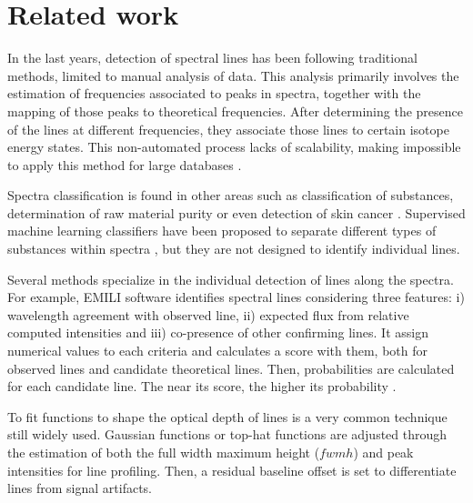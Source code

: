 \section{Related work} \label{sec:related_work}

\begin{comment}
    - What is currently being done
    - Manual Process Problems
    - Factors that make this problem non-trivial
    - Semi-Automatic Method
    - Ramadan Spectroscopy
    - Physics Models
    - Utility of another approach (this approach)
\end{comment}

In the last years, detection of spectral lines has been following traditional methods, limited to manual analysis of data.
This analysis primarily involves the estimation of frequencies associated to peaks in spectra, together with the mapping of those peaks
to theoretical frequencies.
After determining the presence of the lines at different frequencies, they associate those lines to certain isotope energy states.
This non-automated process lacks of scalability, making impossible to apply this method for large databases \citep{schilke_line_2001}.

Spectra classification is found in other areas such as classification of substances, determination of raw material purity or even detection of skin cancer \citep{sigurdsson_detection_2004}.
Supervised machine learning classifiers have been proposed to separate different types of substances within spectra \citep{howley_effect_2005}, but they are not designed to identify individual lines.

Several methods specialize in the individual detection of lines along the spectra.
For example, EMILI software identifies spectral lines considering three features:
i) wavelength agreement with observed line, 
ii) expected flux from relative computed intensities and
iii) co-presence of other confirming lines.
It assign numerical values to each criteria and calculates a score with them, both for observed lines and candidate theoretical lines.
Then, probabilities are calculated for each candidate line.
The near its score, the higher its probability \citep{sharpee_introducing_2003}.

To fit functions to shape the optical depth of lines is a very common technique still widely used.
Gaussian functions \citep{fuller_thermal_1993, nummelin_three-position_2000} or top-hat functions \citep{smith_molecular_2015} are adjusted through the estimation of both the full width maximum height ($fwmh$) and peak intensities for line profiling.
Then, a residual baseline offset is set to differentiate lines from signal artifacts.

